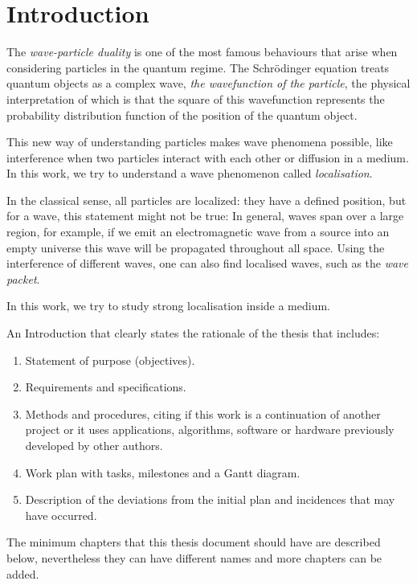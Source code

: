 \clearpage
\newpage
\section{Introduction}

The \textit{wave-particle duality} is one of the most famous behaviours that arise when considering particles in the quantum regime. The Schrödinger equation treats quantum objects as a complex wave, \textit{the wavefunction of the particle}, the physical interpretation of which is that the square of this wavefunction represents the probability distribution function of the position of the quantum object.

This new way of understanding particles makes wave phenomena possible, like interference when two particles interact with each other or diffusion in a medium. In this work, we try to understand a wave phenomenon called \textit{localisation}. 

In the classical sense, all particles are localized: they have a defined position, but for a wave, this statement might not be true: In general, waves span over a large region, for example, if we emit an electromagnetic wave from a source into an empty universe this wave will be propagated throughout all space. Using the interference of different waves, one can also find localised waves, such as the \textit{wave packet}.

In this work, we try to study strong localisation inside a medium. 

{An Introduction that clearly states the rationale of the thesis that includes:}

\begin{enumerate}
\item {Statement of purpose (objectives).}
\item {Requirements and specifications.}
\item {Methods and procedures, citing if this work is a continuation of another project or it uses applications, algorithms,
software or hardware previously developed by other authors.}
\item {Work plan with tasks, milestones and a Gantt diagram.}
\item {Description of the deviations from the initial plan and incidences that may have occurred. }
\end{enumerate}

\bigskip

{The minimum chapters that this thesis document should have are described below, nevertheless they can have different
names and more chapters can be added.}

